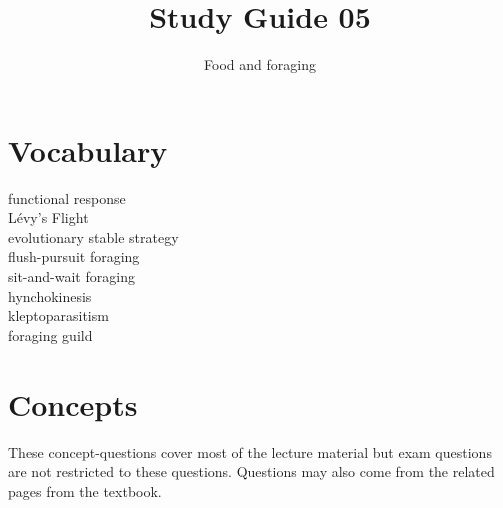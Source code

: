 \documentclass[nofonts, letterpaper]{tufte-handout}
\title{Study Guide 05}
\author{Food and foraging}
\date{} %
\begin{document}
\maketitle	%


\section{Vocabulary}
\vspace{-1\baselineskip}
\begin{multicols}{2}
functional response \\
Lévy's Flight \\
evolutionary stable strategy \\
flush-pursuit foraging \\
sit-and-wait foraging \\
hynchokinesis  \\
kleptoparasitism \\
foraging guild 
\end{multicols}

\section{Concepts}

These concept-questions cover most of the lecture material but exam questions are not restricted to these questions. Questions may also come from the related pages from the textbook.\vspace{\baselineskip}
\end{document}
